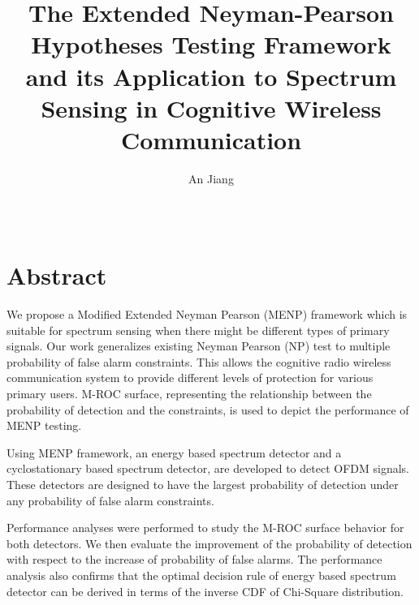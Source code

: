\documentclass [12pt,letterpaper]{report}
\begin{document}

\title{The Extended Neyman-Pearson Hypotheses Testing Framework and its Application to Spectrum Sensing in Cognitive Wireless Communication}
\author{An Jiang}
\date{\Month\ \number\year}

\maketitle

\raggedbottom
\doublespacing
{}

\section*{\centering Abstract}
We propose a Modified Extended Neyman Pearson (MENP) framework which is suitable for spectrum sensing when there might be different types of primary signals. Our work generalizes existing Neyman Pearson (NP) test to multiple probability of false alarm constraints. This allows the cognitive radio wireless communication system to provide different levels of protection for various primary users.  
M-ROC surface, representing the relationship between the probability of detection and the constraints, is used to depict the performance of MENP testing.   

Using MENP framework, an energy based spectrum detector and a cyclostationary based spectrum detector, are developed to detect OFDM signals. These detectors are designed to have the largest probability of detection under any probability of false alarm constraints.  

Performance analyses were performed to study the M-ROC surface behavior for both detectors. We then evaluate the improvement of the probability of detection with respect to the increase of probability of false alarms.  
The performance analysis also confirms that the optimal decision rule of energy based spectrum detector can be derived in terms of the inverse CDF of Chi-Square distribution.  
\end{document}

